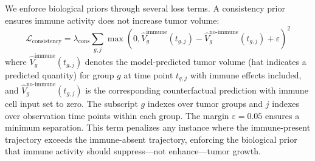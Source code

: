 \documentclass{juliacon}
\begin{document}
We enforce biological priors through several loss terms. A consistency prior ensures immune activity does not increase tumor volume:
\begin{equation}
\mathcal{L}_{\text{consistency}} = \lambda_{\text{cons}} \sum_{g,j} \max\left(0, \hat{V}^{\text{immune}}_g(t_{g,j}) - \hat{V}^{\text{no-immune}}_g(t_{g,j}) + \varepsilon\right)^2
\label{eq:consistency_prior}
\end{equation}
where $\hat{V}^{\text{immune}}_g(t_{g,j})$ denotes the model-predicted tumor volume (hat indicates a predicted quantity) for group $g$ at time point $t_{g,j}$ with immune effects included, and $\hat{V}^{\text{no-immune}}_g(t_{g,j})$ is the corresponding counterfactual prediction with immune cell input set to zero. The subscript $g$ indexes over tumor groups and $j$ indexes over observation time points within each group. The margin $\varepsilon = 0.05$ ensures a minimum separation. This term penalizes any instance where the immune-present trajectory exceeds the immune-absent trajectory, enforcing the biological prior that immune activity should suppress---not enhance---tumor growth.
\end{document}
